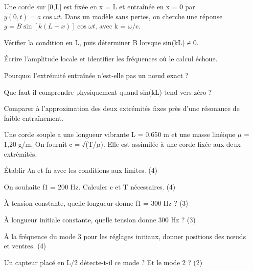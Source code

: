 \label{ch10-ex-D3}
Une corde sur [0,L] est fixée en x = L et entraînée en x = 0 par $y(0,t)=a\cos\omega t$. Dans un modèle sans pertes, on cherche une réponse $y=B\sin[k(L-x)]\cos\omega t$, avec k = \ensuremath{\omega}/c.\begin{questions}
\item Vérifier la condition en L, puis déterminer B lorsque sin(kL) ≠ 0.
\item Écrire l’amplitude locale et identifier les fréquences où le calcul échoue.
\item Pourquoi l’extrémité entraînée n’est-elle pas un nœud exact ?
\item Que faut-il comprendre physiquement quand sin(kL) tend vers zéro ?
\item Comparer à l’approximation des deux extrémités fixes près d’une résonance de faible entraînement.
\end{questions}


Une corde souple a une longueur vibrante L = 0,650 m et une masse linéique \ensuremath{\mu} = 1,20 g/m. On fournit c = √(T/\ensuremath{\mu}). Elle est assimilée à une corde fixée aux deux extrémités.
\begin{questions}
\item Établir \ensuremath{\lambda}n et fn avec les conditions aux limites. (4)
\item On souhaite f1 = 200 Hz. Calculer c et T nécessaires. (4)
\end{questions}

\begin{questions}
\item À tension constante, quelle longueur donne f1 = 300 Hz ? (3)
\item À longueur initiale constante, quelle tension donne 300 Hz ? (3)
\end{questions}

\begin{questions}
\item À la fréquence du mode 3 pour les réglages initiaux, donner positions des nœuds et ventres. (4)
\item Un capteur placé en L/2 détecte-t-il ce mode ? Et le mode 2 ? (2)
\end{questions}



